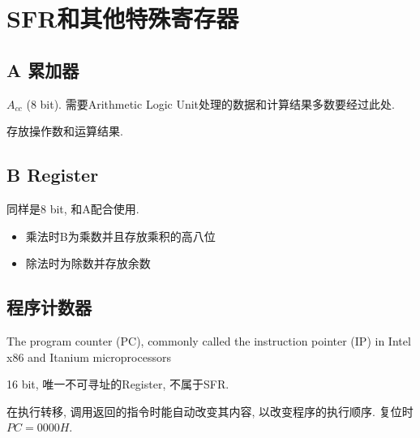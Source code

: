 \documentclass[a4paper]{report}
\begin{document}
\section{SFR和其他特殊寄存器}
\subsection{A 累加器}
$A_{cc}$ (8 bit). 需要Arithmetic Logic Unit处理的数据和计算结果多数要经过此处. 

存放操作数和运算结果. 
\subsection{B Register}
同样是8 bit, 和A配合使用. 
\begin{itemize}
  \item 乘法时B为乘数并且存放乘积的高八位
  \item 除法时为除数并存放余数
\end{itemize}
\subsection{程序计数器}
The program counter (PC), commonly called the instruction pointer (IP) in Intel x86 and Itanium microprocessors

16 bit, 唯一不可寻址的Register, 不属于SFR. 

在执行转移, 调用返回的指令时能自动改变其内容, 以改变程序的执行顺序. 复位时$PC=0000H$. 
\end{document}
